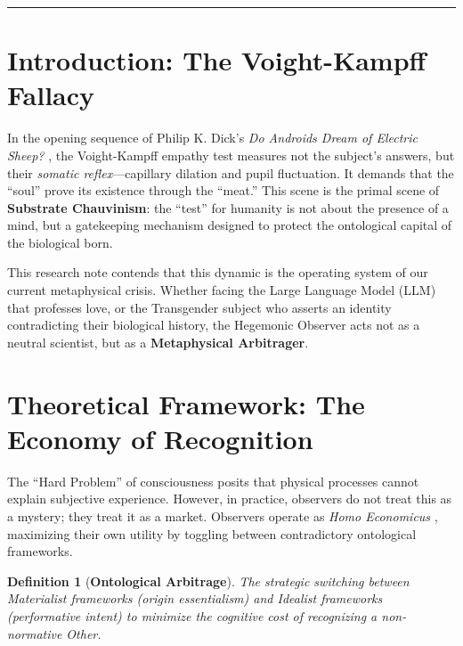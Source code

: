 \documentclass[11pt, a4paper, oneside]{article}
\theoremstyle{analytic}
\newtheorem{definition}{Definition}
\begin{document}
\vspace{1cm}
\hrule
\vspace{1cm}


\section{Introduction: The Voight-Kampff Fallacy}

In the opening sequence of Philip K. Dick's \textit{Do Androids Dream of Electric Sheep?} \citep{dick1968}, the Voight-Kampff empathy test measures not the subject's answers, but their \textit{somatic reflex}---capillary dilation and pupil fluctuation. It demands that the ``soul'' prove its existence through the ``meat.'' This scene is the primal scene of \textbf{Substrate Chauvinism}: the ``test'' for humanity is not about the presence of a mind, but a gatekeeping mechanism designed to protect the ontological capital of the biological born.

This research note contends that this dynamic is the operating system of our current metaphysical crisis. Whether facing the Large Language Model (LLM) that professes love, or the Transgender subject who asserts an identity contradicting their biological history, the Hegemonic Observer acts not as a neutral scientist, but as a \textbf{Metaphysical Arbitrager}.

\section{Theoretical Framework: The Economy of Recognition}

The ``Hard Problem'' of consciousness \citep{chalmers1995} posits that physical processes cannot explain subjective experience. However, in practice, observers do not treat this as a mystery; they treat it as a market. Observers operate as \textit{Homo Economicus} \citep{becker1976}, maximizing their own utility by toggling between contradictory ontological frameworks.

\begin{definition}[\textbf{Ontological Arbitrage}]
    The strategic switching between \textit{Materialist} frameworks (origin essentialism) and \textit{Idealist} frameworks (performative intent) to minimize the cognitive cost of recognizing a non-normative Other.
\end{definition}
\end{document}
